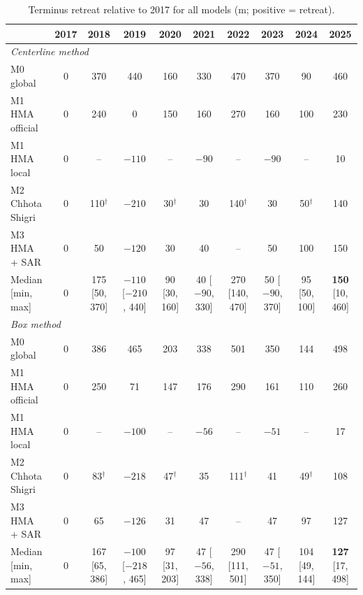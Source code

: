 \documentclass[10pt]{article}
\newcommand{\tr}{$^\dagger$}   %
\begin{document}
\begin{table}
\centering\footnotesize
\setlength{\tabcolsep}{3.5pt}
\begin{threeparttable}
\caption{Terminus retreat relative to 2017 for all models (m; positive = retreat).}
\label{tab:all_terminus}
\begin{tabular}{l ccccccccc}
\toprule
 & \textbf{2017} & \textbf{2018} & \textbf{2019} & \textbf{2020} & \textbf{2021} & \textbf{2022} & \textbf{2023} & \textbf{2024} & \textbf{2025} \\
\midrule
\multicolumn{10}{l}{\textit{Centerline method}} \\
M0 global                          & 0 & 370 & 440 & 160 & 330 & 470 & 370 & 90 & 460 \\
M1 HMA official                    & 0 & 240 & 0 & 150 & 160 & 270 & 160 & 100 & 230 \\
M1 HMA local                       & 0 & -- & $-110$ & -- & $-90$ & -- & $-90$ & -- & 10 \\
M2 Chhota Shigri                   & 0 & 110\tr & $-210$ & 30\tr & 30 & 140\tr & 30 & 50\tr & 140 \\
M3 HMA + SAR                       & 0 & 50 & $-120$ & 30 & 40 & -- & 50 & 100 & 150 \\
Median [min, max]                  & 0 & 175 [50, 370] & $-110$ [$-210$, 440] & 90 [30, 160] & 40 [$-90$, 330] & 270 [140, 470] & 50 [$-90$, 370] & 95 [50, 100] & \textbf{150} [10, 460] \\
\midrule
\multicolumn{10}{l}{\textit{Box method}} \\
M0 global                          & 0 & 386 & 465 & 203 & 338 & 501 & 350 & 144 & 498 \\
M1 HMA official                    & 0 & 250 & 71 & 147 & 176 & 290 & 161 & 110 & 260 \\
M1 HMA local                       & 0 & -- & $-100$ & -- & $-56$ & -- & $-51$ & -- & 17 \\
M2 Chhota Shigri                   & 0 & 83\tr & $-218$ & 47\tr & 35 & 111\tr & 41 & 49\tr & 108 \\
M3 HMA + SAR                       & 0 & 65 & $-126$ & 31 & 47 & -- & 47 & 97 & 127 \\
Median [min, max]                  & 0 & 167 [65, 386] & $-100$ [$-218$, 465] & 97 [31, 203] & 47 [$-56$, 338] & 290 [111, 501] & 47 [$-51$, 350] & 104 [49, 144] & \textbf{127} [17, 498] \\

\end{tabular}
\end{threeparttable}
\end{table}
\end{document}
